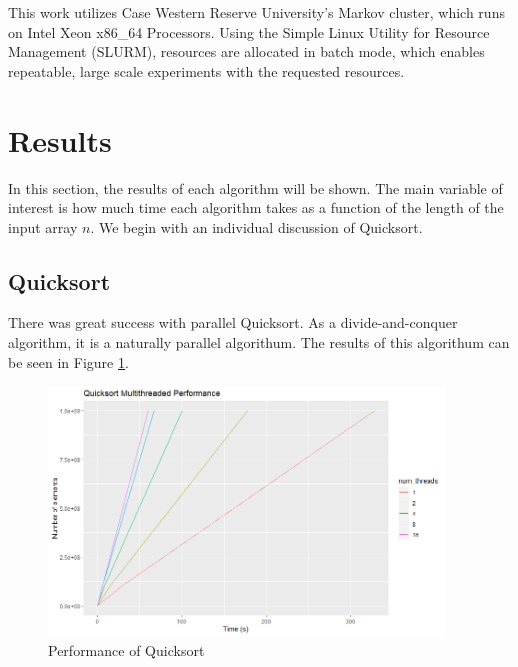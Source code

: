 \documentclass[conference]{IEEEtran}
\begin{document}
This work utilizes Case Western Reserve University's Markov cluster, which runs on Intel Xeon x86\_64 Processors. 
Using the Simple Linux Utility for Resource Management \cite{yoo_slurm_2003} (SLURM), resources are allocated in batch mode, which enables repeatable, large scale experiments with the requested resources. 

\section{Results}
In this section, the results of each algorithm will be shown. 
The main variable of interest is how much time each algorithm takes as a function of the length of the input array $n$. 
We begin with an individual discussion of Quicksort. 

\subsection{Quicksort}
There was great success with parallel Quicksort. 
As a divide-and-conquer algorithm, it is a naturally parallel algorithum. 
The results of this algorithum can be seen in Figure \ref{qck_per}. 
\begin{figure}[h]
	\includegraphics[width=10.5cm]{qs_mt.png} 
	\caption{Performance of Quicksort}
	\label{qck_per}
\end{figure}

\end{document}
